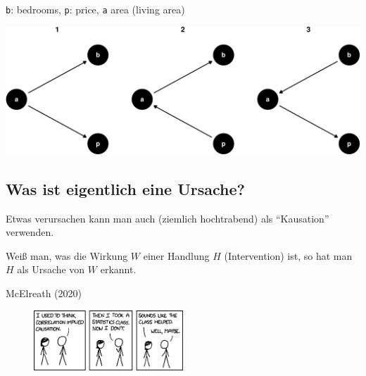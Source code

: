 \documentclass[
  a4paper,
  DIV=11]{scrreprt}
\theoremstyle{definition}
\theoremstyle{remark}
\begin{document}
\texttt{b}: bedrooms, \texttt{p}: price, \texttt{a} area (living area)

\includegraphics{./kausal_files/figure-pdf/dag-km1-1.pdf}

\hypertarget{was-ist-eigentlich-eine-ursache}{%
\subsection{Was ist eigentlich eine
Ursache?}\label{was-ist-eigentlich-eine-ursache}}

Etwas verursachen kann man auch (ziemlich hochtrabend) als ``Kausation''
verwenden.

\begin{tcolorbox}[enhanced jigsaw, colframe=quarto-callout-note-color-frame, title=\textcolor{quarto-callout-note-color}{\faInfo}\hspace{0.5em}{Hinweis}, breakable, leftrule=.75mm, coltitle=black, toptitle=1mm, bottomrule=.15mm, bottomtitle=1mm, opacityback=0, arc=.35mm, rightrule=.15mm, left=2mm, colbacktitle=quarto-callout-note-color!10!white, opacitybacktitle=0.6, toprule=.15mm, titlerule=0mm, colback=white]
Weiß man, was die Wirkung \(W\) einer Handlung \(H\) (Intervention) ist,
so hat man \(H\) als Ursache von \(W\) erkannt.
\end{tcolorbox}

McElreath (2020)

\begin{figure}

{\centering \includegraphics[width=0.5\textwidth,height=\textheight]{./img/correlation.png}

}

\end{figure}
\end{document}

